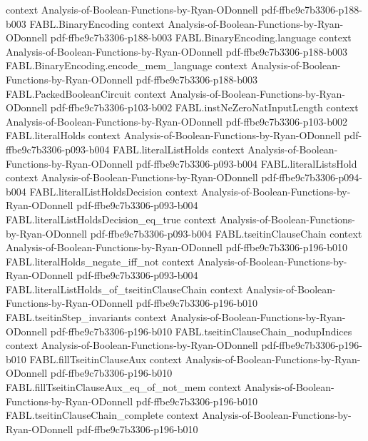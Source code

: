 \begin{theorem}
  {context}
  {Analysis-of-Boolean-Functions-by-Ryan-ODonnell}
  {pdf-ffbe9c7b3306-p188-b003}
\proofstep
  {FABL.BinaryEncoding}
  {context}
  {Analysis-of-Boolean-Functions-by-Ryan-ODonnell}
  {pdf-ffbe9c7b3306-p188-b003}
\proofstep
  {FABL.BinaryEncoding.language}
  {context}
  {Analysis-of-Boolean-Functions-by-Ryan-ODonnell}
  {pdf-ffbe9c7b3306-p188-b003}
\proofstep
  {FABL.BinaryEncoding.encode_mem_language}
  {context}
  {Analysis-of-Boolean-Functions-by-Ryan-ODonnell}
  {pdf-ffbe9c7b3306-p188-b003}
\proofstep
  {FABL.PackedBooleanCircuit}
  {context}
  {Analysis-of-Boolean-Functions-by-Ryan-ODonnell}
  {pdf-ffbe9c7b3306-p103-b002}
\proofstep
  {FABL.instNeZeroNatInputLength}
  {context}
  {Analysis-of-Boolean-Functions-by-Ryan-ODonnell}
  {pdf-ffbe9c7b3306-p103-b002}
\proofstep
  {FABL.literalHolds}
  {context}
  {Analysis-of-Boolean-Functions-by-Ryan-ODonnell}
  {pdf-ffbe9c7b3306-p093-b004}
\proofstep
  {FABL.literalListHolds}
  {context}
  {Analysis-of-Boolean-Functions-by-Ryan-ODonnell}
  {pdf-ffbe9c7b3306-p093-b004}
\proofstep
  {FABL.literalListsHold}
  {context}
  {Analysis-of-Boolean-Functions-by-Ryan-ODonnell}
  {pdf-ffbe9c7b3306-p094-b004}
\proofstep
  {FABL.literalListHoldsDecision}
  {context}
  {Analysis-of-Boolean-Functions-by-Ryan-ODonnell}
  {pdf-ffbe9c7b3306-p093-b004}
\proofstep
  {FABL.literalListHoldsDecision_eq_true}
  {context}
  {Analysis-of-Boolean-Functions-by-Ryan-ODonnell}
  {pdf-ffbe9c7b3306-p093-b004}
\proofstep
  {FABL.tseitinClauseChain}
  {context}
  {Analysis-of-Boolean-Functions-by-Ryan-ODonnell}
  {pdf-ffbe9c7b3306-p196-b010}
\proofstep
  {FABL.literalHolds_negate_iff_not}
  {context}
  {Analysis-of-Boolean-Functions-by-Ryan-ODonnell}
  {pdf-ffbe9c7b3306-p093-b004}
\proofstep
  {FABL.literalListHolds_of_tseitinClauseChain}
  {context}
  {Analysis-of-Boolean-Functions-by-Ryan-ODonnell}
  {pdf-ffbe9c7b3306-p196-b010}
\proofstep
  {FABL.tseitinStep_invariants}
  {context}
  {Analysis-of-Boolean-Functions-by-Ryan-ODonnell}
  {pdf-ffbe9c7b3306-p196-b010}
\proofstep
  {FABL.tseitinClauseChain_nodupIndices}
  {context}
  {Analysis-of-Boolean-Functions-by-Ryan-ODonnell}
  {pdf-ffbe9c7b3306-p196-b010}
\proofstep
  {FABL.fillTseitinClauseAux}
  {context}
  {Analysis-of-Boolean-Functions-by-Ryan-ODonnell}
  {pdf-ffbe9c7b3306-p196-b010}
\proofstep
  {FABL.fillTseitinClauseAux_eq_of_not_mem}
  {context}
  {Analysis-of-Boolean-Functions-by-Ryan-ODonnell}
  {pdf-ffbe9c7b3306-p196-b010}
\proofstep
  {FABL.tseitinClauseChain_complete}
  {context}
  {Analysis-of-Boolean-Functions-by-Ryan-ODonnell}
  {pdf-ffbe9c7b3306-p196-b010}
\proofstep

\end{theorem}
